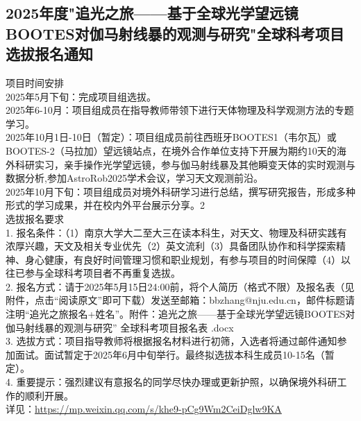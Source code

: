 \documentclass[letterpaper, 12pt]{article}
\begin{document}
\begin{multicols}{2}
\section{2025年度"追光之旅——基于全球光学望远镜BOOTES对伽马射线暴的观测与研究"全球科考项目选拔报名通知}
项目时间安排
\\2025年5月下旬：完成项目组选拔。
\\2025年6-10月：项目组成员在指导教师带领下进行天体物理及科学观测方法的专题学习。
\\2025年10月1日-10日（暂定）：项目组成员前往西班牙BOOTES1（韦尔瓦）或BOOTES-2（马拉加）望远镜站点，在境外合作单位支持下开展为期约10天的海外科研实习，亲手操作光学望远镜，参与伽马射线暴及其他瞬变天体的实时观测与数据分析,参加AstroRob2025学术会议，学习天文观测前沿。
\\2025年10月下旬：项目组成员对境外科研学习进行总结，撰写研究报告，形成多种形式的学习成果，并在校内外平台展示分享。2
\\选拔报名要求
\\1. 报名条件：（1）南京大学大二至大三在读本科生，对天文、物理及科研实践有浓厚兴趣，天文及相关专业优先（2）英文流利（3）具备团队协作和科学探索精神、身心健康，有良好时间管理习惯和职业规划，有参与项目的时间保障（4）以往已参与全球科考项目者不再重复选拔。
\\2. 报名方式：请于2025年5月15日24:00前，将个人简历（格式不限）及报名表（见附件，点击“阅读原文”即可下载）发送至邮箱：bbzhang@nju.edu.cn，邮件标题请注明“追光之旅报名+姓名”。附件：追光之旅——基于全球光学望远镜BOOTES对伽马射线暴的观测与研究”  全球科考项目报名表  .docx
\\3. 选拔方式：项目指导教师将根据报名材料进行初筛，入选者将通过邮件通知参加面试。面试暂定于2025年6月中旬举行。最终拟选拔本科生成员10-15名（暂定）。
\\4. 重要提示：强烈建议有意报名的同学尽快办理或更新护照，以确保境外科研工作的顺利开展。
\\详见：\url{https://mp.weixin.qq.com/s/khe9-pCg9Wm2CeiDglw9KA}





\end{multicols}
\end{document}
